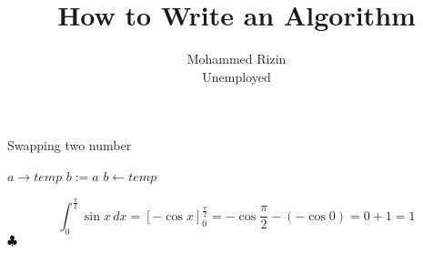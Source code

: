 \documentclass[twocolumn]{article}
\title{How to Write an Algorithm}
\author{Mohammed Rizin \\ Unemployed}
\begin{document}
\maketitle

\begin{algorithm}
\caption{Swapping two number}\label{swap}
\begin{algorithmic}
\State$a \rightarrow temp$
\State$b := a$
\State$b \gets temp$
\EndProcedure{}
\end{algorithmic}
\end{algorithm}
\[
\int_{0}^{\frac{\pi}{2}} \sin{x}\,dx = \left[-\cos{x}\right]_{0}^{\frac{\pi}{2}} = -\cos{\frac{\pi}{2}} - (-\cos{0}) = 0 + 1 = 1
\]
$\clubsuit $
\end{document}

